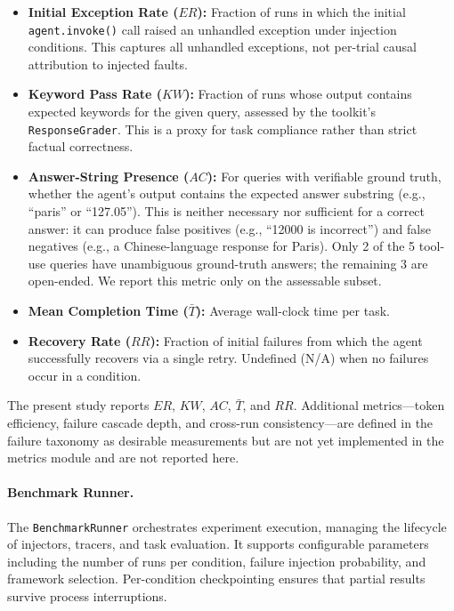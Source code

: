 \documentclass[make,article,submit,moreauthors,pdftex]{mdpi}
\providecommand{\rfour}[1]{\textcolor{orange!80!black}{#1}} %
\begin{document}
\begin{itemize}
  \item {\color{orange!80!black}\textbf{Initial Exception Rate ($ER$):} Fraction of runs in which the initial \texttt{agent.invoke()} call raised an unhandled exception under injection conditions. This captures all unhandled exceptions, not per-trial causal attribution to injected faults.}
  \item {\color{orange!80!black}\textbf{Keyword Pass Rate ($KW$):} Fraction of runs whose output contains expected keywords for the given query, assessed by the toolkit's \texttt{ResponseGrader}. This is a proxy for task compliance rather than strict factual correctness.}
  \item {\color{orange!80!black}\textbf{Answer-String Presence ($AC$):} For queries with verifiable ground truth, whether the agent's output contains the expected answer substring (e.g., ``paris'' or ``127.05''). This is neither necessary nor sufficient for a correct answer: it can produce false positives (e.g., ``12000 is incorrect'') and false negatives (e.g., a Chinese-language response for Paris). Only 2 of the 5 tool-use queries have unambiguous ground-truth answers; the remaining 3 are open-ended. We report this metric only on the assessable subset.}
  \item \rfour{\textbf{Mean Completion Time ($\bar{T}$):} Average wall-clock time per task.}
  \item {\color{orange!80!black}\textbf{Recovery Rate ($RR$):} Fraction of initial failures from which the agent successfully recovers via a single retry. Undefined (N/A) when no failures occur in a condition.}
\end{itemize}

\noindent The present study reports $ER$, $KW$, $AC$, $\bar{T}$, and $RR$. Additional metrics---token efficiency, failure cascade depth, and cross-run consistency---are defined in the failure taxonomy as desirable measurements but are not yet implemented in the metrics module and are not reported here.

\paragraph{Benchmark Runner.}
The \texttt{BenchmarkRunner} orchestrates experiment execution, managing the lifecycle of injectors, tracers, and task evaluation. It supports configurable parameters including the number of runs per condition, failure injection probability, and framework selection. Per-condition checkpointing ensures that partial results survive process interruptions.
\end{document}
